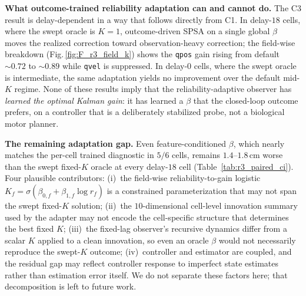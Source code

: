 \documentclass[sn-mathphys,NameDate,iicol]{sn-jnl}
\begin{document}
\noindent\textbf{What outcome-trained reliability adaptation can and
cannot do.} The C3 result is delay-dependent in a way that follows
directly from C1. In delay-$18$ cells, where the swept oracle is
$K\!=\!1$, outcome-driven SPSA on a single global $\beta$ moves the
realized correction toward observation-heavy correction; the
field-wise breakdown (Fig.\,\ref{fig:F_r3_field_k}) shows the
\texttt{qpos} gain rising from default $\sim\!0.72$ to $\sim\!0.89$
while \texttt{qvel} is suppressed. In delay-$0$ cells, where the swept oracle is
intermediate, the same adaptation yields no improvement over
the default mid-$K$ regime. None of these results imply that the
reliability-adaptive observer has \emph{learned the optimal Kalman
gain}: it has learned a $\beta$ that the closed-loop outcome
prefers, on a controller that is a deliberately stabilized probe,
not a biological motor planner.

\noindent\textbf{The remaining adaptation gap.}
Even feature-conditioned $\beta$, which nearly matches the per-cell
trained diagnostic in $5/6$ cells, remains $1.4\text{--}1.8$\,cm
worse than the swept fixed-$K$ oracle at every delay-$18$ cell
(Table~\ref{tab:r3_paired_ci}). Four plausible contributors:
(i)~the field-wise reliability-to-gain logistic
$K_f\!=\!\sigma(\beta_{0,f}+\beta_{1,f}\log r_f)$ is a constrained
parameterization that may not span the swept fixed-$K$ solution; (ii)~the
$10$-dimensional cell-level innovation summary used by the adapter may
not encode the cell-specific structure that determines the best fixed
$K$; (iii)~the
fixed-lag observer's recursive dynamics differ from a scalar
$K$ applied to a clean innovation, so even an oracle $\beta$ would
not necessarily reproduce the swept-$K$ outcome; (iv)~controller and
estimator are coupled, and the residual gap may reflect controller
response to imperfect state estimates rather than estimation error
itself. We do not separate these factors here; that decomposition is
left to future work.
\end{document}
